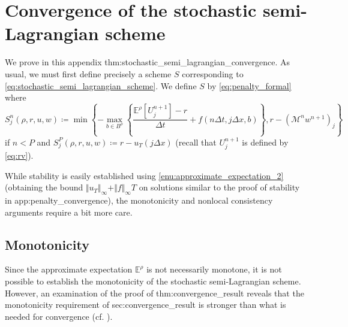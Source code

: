 \documentclass[12pt]{article}
\begin{document}
\section{\label{app:stochastic_semi_lagrangian_convergence}Convergence of
the stochastic semi-Lagrangian scheme}

We prove in this appendix {\prettyref}{thm:stochastic_semi_lagrangian_convergence}.
As usual, we must first define precisely a scheme $S$ corresponding
to \eqref{eq:stochastic_semi_lagrangian_scheme}. We define $S$ by
\eqref{eq:penalty_formal} where
\[
S_{j}^{n}(\rho,r,u,w)\coloneqq
\min\left\{ -\max_{b\in B^{\rho}}\left\{ \frac{\mathbb{E}^{\rho}\left[U_j^{n+1}\right]-r}{\Delta t}+f(n\Delta t,j\Delta x,b)\right\} ,r-(\mathcal{M}^{n}w^{n+1})_{j}\right\} 
\]
if $n<P$ and $S_{j}^{P}(\rho,r,u,w)\coloneqq r-u_{T}(j\Delta x)$ (recall that $U_j^{n+1}$ is defined by \eqref{eq:rv}).

While stability is easily established using \ref{enu:approximate_expectation_2}
(obtaining the bound $\Vert u_{T}\Vert_{\infty}+\Vert f\Vert_{\infty}T$
on solutions similar to the proof of stability in {\prettyref}{app:penalty_convergence}),
the monotonicity and nonlocal consistency arguments require a bit
more care.

\subsection{Monotonicity}

Since the approximate expectation $\mathbb{E}^{\rho}$ is not necessarily
monotone, it is not possible to establish the monotonicity of the
stochastic semi-Lagrangian scheme. However, an examination of the
proof of {\prettyref}{thm:convergence_result} reveals that the monotonicity
requirement of {\prettyref}{sec:convergence_result} is stronger than
what is needed for convergence (cf. \cite[Remark 2.1]{MR1115933}).
\end{document}
